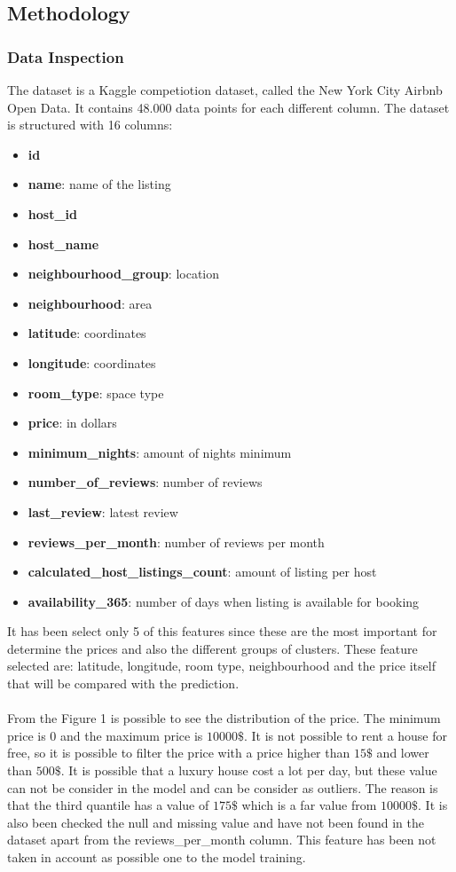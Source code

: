 \documentclass{FR16}
\begin{document}
\subsection{Methodology}
\subsubsection{Data Inspection}
The dataset is a Kaggle competiotion dataset, called the New York City Airbnb Open Data. It contains 48.000 data points for each different column.
The dataset is structured with 16 columns: 
\begin{itemize}
\itemsep0em 
\item \textbf{id}
\item \textbf{name}: name of the listing
\item \textbf{host\_id}
\item \textbf{host\_name}
\item \textbf{neighbourhood\_group}: location
\item \textbf{neighbourhood}: area
\item \textbf{latitude}: coordinates
\item \textbf{longitude}: coordinates
\item \textbf{room\_type}: space type
\item \textbf{price}:  in dollars
\item \textbf{minimum\_nights}: amount of nights minimum
\item \textbf{number\_of\_reviews}: number of reviews
\item \textbf{last\_review}: latest review
\item \textbf{reviews\_per\_month}: number of reviews per month
\item \textbf{calculated\_host\_listings\_count}: amount of listing per host
\item  \textbf{availability\_365}: number of days when listing is available for booking\\
\end{itemize}
It has been select only 5 of this features since these are the most important for determine the prices and also the different groups of clusters. These feature selected are: latitude, longitude, room type, neighbourhood and the price itself that will be compared with the prediction.\\\\
From the Figure 1 is possible to see the distribution of the price. The minimum price is $0$ and the maximum price is $10000\$$. It is not possible to rent a house for free, so it is possible to filter the price with a price higher than $15\$$ and lower than $500\$$. It is possible that a luxury house cost a lot per day, but these value can not be consider in the model and can be consider as outliers. The reason is that the third quantile has a value of $175\$$ which is a far value from $10000\$$. It is also been checked the null and missing value and have not been found in the dataset apart from the reviews\_per\_month column. This feature has been not taken in account as possible one to the model training. 
\end{document}
